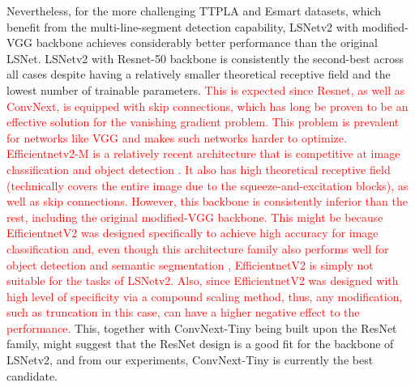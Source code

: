 \documentclass[journal]{IEEEtran}
\newcommand{\textK}[1]{\textcolor{red}{#1}}
\begin{document}
Nevertheless, for the more challenging TTPLA and Esmart datasets, which benefit from the multi-line-segment detection capability, LSNetv2 with modified-VGG backbone achieves considerably better performance than the original LSNet. LSNetv2 with Resnet-50 backbone is consistently the second-best across all cases despite having a relatively smaller theoretical receptive field and the lowest number of trainable parameters. \textK{This is expected since Resnet, as well as ConvNext, is equipped with skip connections, which has long be proven to be an effective solution for the vanishing gradient problem. This problem is prevalent for networks like VGG and makes such networks harder to optimize. Efficientnetv2-M is a relatively recent architecture that is competitive at image classification \cite{efficientnetv2} and object detection \cite{efficientdet}. It also has high theoretical receptive field (technically covers the entire image due to the squeeze-and-excitation blocks), as well as skip connections. However, this backbone is consistently inferior than the rest, including the original modified-VGG backbone. This might be because EfficientnetV2 was designed specifically to achieve high accuracy for image classification and, even though this architecture family also performs well for object detection and semantic segmentation \cite{efficientnetv2}, EfficientnetV2 is simply not suitable for the tasks of LSNetv2. Also, since EfficientnetV2 was designed with high level of specificity via a compound scaling method, thus, any modification, such as truncation in this case, can have a higher negative effect to the performance.} This, together with ConvNext-Tiny being built upon the ResNet family, might suggest that the ResNet design is a good fit for the backbone of LSNetv2, and from our experiments, ConvNext-Tiny is currently the best candidate.
\end{document}
